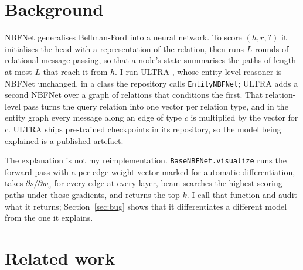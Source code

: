 \documentclass[10pt,twocolumn,letterpaper]{article}
\begin{document}
\section{Background}

NBFNet generalises Bellman-Ford into a neural network. To score \((h, r, ?)\)
it initialises the head with a representation of the relation, then runs \(L\)
rounds of relational message passing, so that a node's state summarises the
paths of length at most \(L\) that reach it from \(h\). I run ULTRA
\cite{ultra}, whose entity-level reasoner is NBFNet unchanged, in a class the
repository calls \texttt{EntityNBFNet}; ULTRA adds a second NBFNet over a graph
of relations that conditions the first. That relation-level pass turns the
query relation into one vector per relation type, and in the entity graph
every message along an edge of type \(c\) is multiplied by the vector for
\(c\). ULTRA ships pre-trained checkpoints in its repository, so the model
being explained is a published artefact.

The explanation is not my reimplementation. \texttt{BaseNBFNet.visualize} runs
the forward pass with a per-edge weight vector marked for automatic
differentiation, takes \(\partial s / \partial w_e\) for every edge at every
layer, beam-searches the highest-scoring paths under those gradients, and
returns the top \(k\). I call that function and audit what it returns;
Section~\ref{sec:bug} shows that it differentiates a different model from
the one it explains.

\section{Related work}
\end{document}
